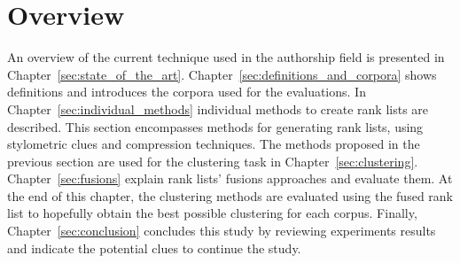 \section{Overview}

An overview of the current technique used in the authorship field is presented in Chapter~\ref{sec:state_of_the_art}.
Chapter~\ref{sec:definitions_and_corpora} shows definitions and introduces the corpora used for the evaluations.
In Chapter~\ref{sec:individual_methods} individual methods to create rank lists are described.
This section encompasses methods for generating rank lists, using stylometric clues and compression techniques.
The methods proposed in the previous section are used for the clustering task in Chapter~\ref{sec:clustering}.
Chapter~\ref{sec:fusions} explain rank lists' fusions approaches and evaluate them.
At the end of this chapter, the clustering methods are evaluated using the fused rank list to hopefully obtain the best possible clustering for each corpus.
Finally, Chapter~\ref{sec:conclusion} concludes this study by reviewing experiments results and indicate the potential clues to continue the study.
